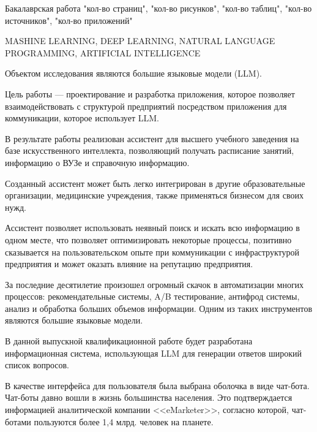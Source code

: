 



Бакалаврская работа "кол-во страниц", "кол-во рисунков", "кол-во таблиц",
"кол-во источников", "кол-во приложений"

MASHINE LEARNING, DEEP LEARNING, NATURAL LANGUAGE PROGRAMMING, 
ARTIFICIAL INTELLIGENCE

Объектом исследования являются большие языковые модели (LLM).

Цель работы --- проектирование и разработка приложения, которое позволяет
взаимодействовать с структурой предприятий посредством приложения для 
коммуникации, которое использует LLM.

В результате работы реализован ассистент для высшего учебного заведения
на базе искусственного интеллекта, позволяющий получать расписание занятий, 
информацию о ВУЗе и справочную информацию.

Созданный ассистент может быть легко интегрирован в другие образовательные
организации, медицинские учреждения, также применяться бизнесом для своих нужд.

Ассистент позволяет использовать неявный поиск и искать всю информацию в одном
месте, что позволяет оптимизировать некоторые процессы, позитивно сказывается на 
пользовательском опыте при коммуникации с инфраструктурой предприятия 
и может оказать влияние на репутацию предприятия.



За последние десятилетие произошел огромный скачок в автоматизации многих процессов:
рекомендательные системы, A/B тестирование, антифрод системы, анализ и обработка
больших объемов информации. Одним из таких инструментов являются большие
языковые модели.

В данной выпускной квалификационной работе будет разработана информационная
система, использующая LLM для генерации ответов широкий список вопросов.

В качестве интерфейса для пользователя была выбрана оболочка в виде чат-бота.
Чат-боты давно вошли в жизнь большинства населения. Это подтверждается 
информацией аналитической компании <<eMarketer>>, согласно которой, чат-ботами
пользуются более 1,4 млрд. человек на планете.

